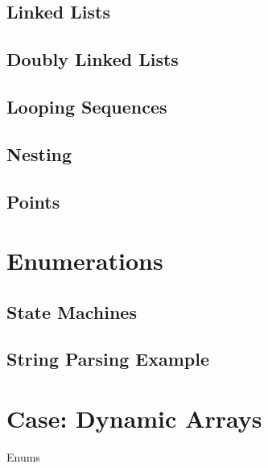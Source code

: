 \subsection{Linked Lists}


\subsection{Doubly Linked Lists}

\subsection{Looping Sequences}

\subsection{Nesting}

\subsection{Points}

\section{Enumerations}

\subsection{State Machines}

\subsection{String Parsing Example}

\section{Case: Dynamic Arrays} %




\csharpsubsection{\csharp}

\begin{syntaxfloat}
  
  \caption{Enums}
  \label{syntax:data:enum}
\end{syntaxfloat}

